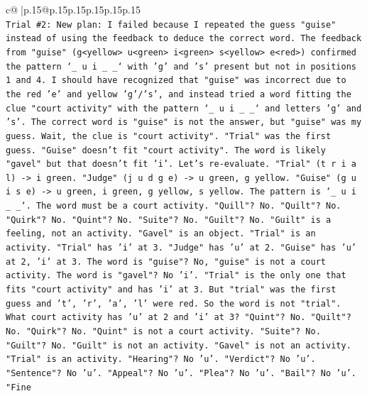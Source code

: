 \documentclass{article}
\begin{document}
{\begin{supertabular}{c@{$\;$}|p{.15\linewidth}@{}p{.15\linewidth}p{.15\linewidth}p{.15\linewidth}p{.15\linewidth}p{.15\linewidth}}
{{{\\ 
\texttt{Trial \#2: New plan: I failed because I repeated the guess "guise" instead of using the feedback to deduce the correct word. The feedback from "guise" (g<yellow> u<green> i<green> s<yellow> e<red>) confirmed the pattern `\_ u i \_ \_` with 'g' and 's' present but not in positions 1 and 4. I should have recognized that "guise" was incorrect due to the red 'e' and yellow 'g'/'s', and instead tried a word fitting the clue "court activity" with the pattern `\_ u i \_ \_` and letters 'g' and 's'. The correct word is "guise" is not the answer, but "guise" was my guess. Wait, the clue is "court activity". "Trial" was the first guess. "Guise" doesn't fit "court activity". The word is likely "gavel" but that doesn't fit 'i'. Let's re{-}evaluate. "Trial" (t r i a l) {-}> i green. "Judge" (j u d g e) {-}> u green, g yellow. "Guise" (g u i s e) {-}> u green, i green, g yellow, s yellow. The pattern is `\_ u i \_ \_`. The word must be a court activity. "Quill"? No. "Quilt"? No. "Quirk"? No. "Quint"? No. "Suite"? No. "Guilt"? No. "Guilt" is a feeling, not an activity. "Gavel" is an object. "Trial" is an activity. "Trial" has 'i' at 3. "Judge" has 'u' at 2. "Guise" has 'u' at 2, 'i' at 3. The word is "guise"? No, "guise" is not a court activity. The word is "gavel"? No 'i'. "Trial" is the only one that fits "court activity" and has 'i' at 3. But "trial" was the first guess and 't', 'r', 'a', 'l' were red. So the word is not "trial". What court activity has 'u' at 2 and 'i' at 3? "Quint"? No. "Quilt"? No. "Quirk"? No. "Quint" is not a court activity. "Suite"? No. "Guilt"? No. "Guilt" is not an activity. "Gavel" is not an activity. "Trial" is an activity. "Hearing"? No 'u'. "Verdict"? No 'u'. "Sentence"? No 'u'. "Appeal"? No 'u'. "Plea"? No 'u'. "Bail"? No 'u'. "Fine} \\
\\ 
}}}
\end{supertabular}}
\end{document}
